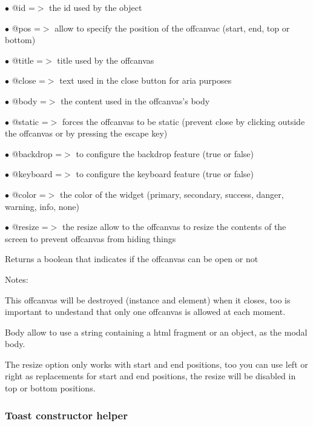 \documentclass[a4paper]{article}
\begin{document}
\begin{compactitem}
\item[\color{myblue}$\bullet$] @id       =$>$ the id used by the object
\item[\color{myblue}$\bullet$] @pos      =$>$ allow to specify the position of the offcanvac (start, end, top or bottom)
\item[\color{myblue}$\bullet$] @title    =$>$ title used by the offcanvas
\item[\color{myblue}$\bullet$] @close    =$>$ text used in the close button for aria purposes
\item[\color{myblue}$\bullet$] @body     =$>$ the content used in the offcanvas's body
\item[\color{myblue}$\bullet$] @static   =$>$ forces the offcanvas to be static (prevent close by clicking outside the
             offcanvas or by pressing the escape key)
\item[\color{myblue}$\bullet$] @backdrop =$>$ to configure the backdrop feature (true or false)
\item[\color{myblue}$\bullet$] @keyboard =$>$ to configure the keyboard feature (true or false)
\item[\color{myblue}$\bullet$] @color    =$>$ the color of the widget (primary, secondary, success, danger, warning, info, none)
\item[\color{myblue}$\bullet$] @resize   =$>$ the resize allow to the offcanvas to resize the contents of the screen to prevent
             offcanvas from hiding things
\end{compactitem}

Returns a boolean that indicates if the offcanvas can be open or not

Notes:

This offcanvas will be destroyed (instance and element) when it closes, too is important
to undestand that only one offcanvas is allowed at each moment.

Body allow to use a string containing a html fragment or an object, as the modal body.

The resize option only works with start and end positions, too you can use left or right
as replacements for start and end positions, the resize will be disabled in top or bottom
positions.

\hypertarget{toc108}{}
\subsubsection{Toast constructor helper}
\end{document}
